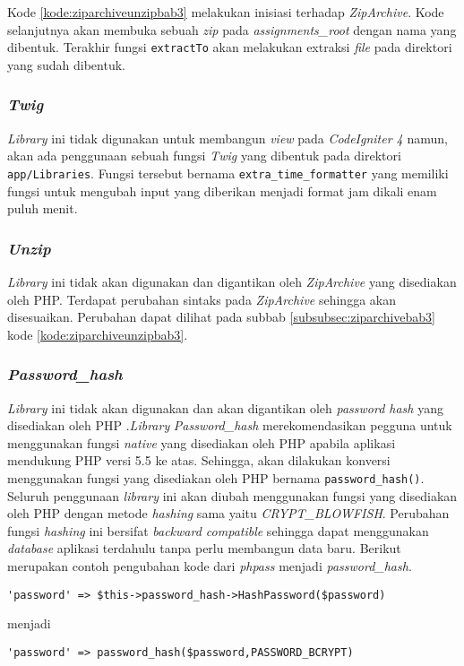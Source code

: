 Kode \ref{kode:ziparchiveunzipbab3} melakukan inisiasi terhadap \textit{ZipArchive}. Kode selanjutnya akan membuka sebuah \textit{zip} pada \textit{assignments\_root} dengan nama yang dibentuk. Terakhir fungsi \texttt{extractTo} akan melakukan extraksi \textit{file} pada direktori yang sudah dibentuk.

\subsubsection{\textit{Twig}}
\textit{Library} ini tidak digunakan untuk membangun \textit{view} pada \textit{CodeIgniter 4} namun, akan ada penggunaan sebuah fungsi \textit{Twig} yang dibentuk pada direktori \texttt{app/Libraries}. Fungsi tersebut bernama \texttt{extra\_time\_formatter} yang memiliki fungsi untuk mengubah input yang diberikan menjadi format jam dikali enam puluh menit. 

\subsubsection{\textit{Unzip}}
\textit{Library} ini tidak akan digunakan dan digantikan oleh \textit{ZipArchive} yang disediakan oleh PHP. Terdapat perubahan sintaks pada \textit{ZipArchive} sehingga akan disesuaikan. Perubahan dapat dilihat pada subbab \ref{subsubsec:ziparchivebab3} kode \ref{kode:ziparchiveunzipbab3}.

\subsubsection{\textit{Password\_hash}}
\textit{Library} ini tidak akan digunakan dan akan digantikan oleh \textit{password hash} yang disediakan oleh PHP .\textit{Library} \textit{Password\_hash} merekomendasikan pegguna untuk menggunakan fungsi \textit{native} yang disediakan oleh PHP apabila aplikasi mendukung PHP versi 5.5 ke atas. Sehingga, akan dilakukan konversi menggunakan fungsi yang disediakan oleh PHP bernama \texttt{password\_hash()}. Seluruh penggunaan \textit{library} ini akan diubah menggunakan fungsi yang disediakan oleh PHP dengan metode \textit{hashing} sama yaitu \textit{CRYPT\_BLOWFISH}. Perubahan fungsi \textit{hashing} ini bersifat \textit{backward compatible} sehingga dapat menggunakan \textit{database} aplikasi terdahulu tanpa perlu membangun data baru. Berikut merupakan contoh pengubahan kode dari \textit{phpass} menjadi \textit{password\_hash}.

\begin{center}
\verb|'password' => $this->password_hash->HashPassword($password)|
\end{center}
menjadi
\begin{center}
\verb|'password' => password_hash($password,PASSWORD_BCRYPT)|
\end{center}

